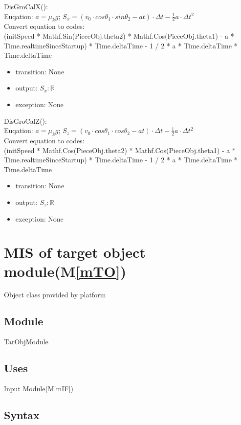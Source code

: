 \documentclass[12pt, titlepage]{article}
\newcommand{\mref}[1]{M\ref{#1}}
\begin{document}
\noindent DisGroCalX():\\
Euqation: $a=\mu_{k}g$; $S_{x}=(v_{0}\cdot cos\theta _{1}\cdot sin\theta _{2} - at)\cdot \Delta t-\frac{1}{2}a \cdot \Delta t^{2}$\\
Convert equation to codes:\\
(initSpeed * Mathf.Sin(PieceObj.theta2) * Mathf.Cos(PieceObj.theta1) - a * Time.realtimeSinceStartup) * Time.deltaTime - 1 / 2 * a * Time.deltaTime * Time.deltaTime
\begin{itemize}
	\item transition: None
	\item output: $S_{x}: \mathbb{R}$ 
	\item exception: None 
\end{itemize}

\noindent DisGroCalZ():\\
Euqation: $a=\mu_{k}g$; $S_{z}=(v_{0}\cdot cos\theta _{1}\cdot cos\theta _{2} - at)\cdot \Delta t-\frac{1}{2}a \cdot \Delta t^{2}$\\
Convert equation to codes:\\
(initSpeed * Mathf.Cos(PieceObj.theta2) * Mathf.Cos(PieceObj.theta1) - a * Time.realtimeSinceStartup) * Time.deltaTime - 1 / 2 * a * Time.deltaTime * Time.deltaTime
\begin{itemize}
	\item transition: None
	\item output: $S_{z}: \mathbb{R}$ 
	\item exception: None 
\end{itemize}

\section{MIS of target object module(\mref{mTO})}

Object class provided by platform

\subsection{Module}

TarObjModule

\subsection{Uses}

Input Module(\mref{mIF})

\subsection{Syntax}
\end{document}
